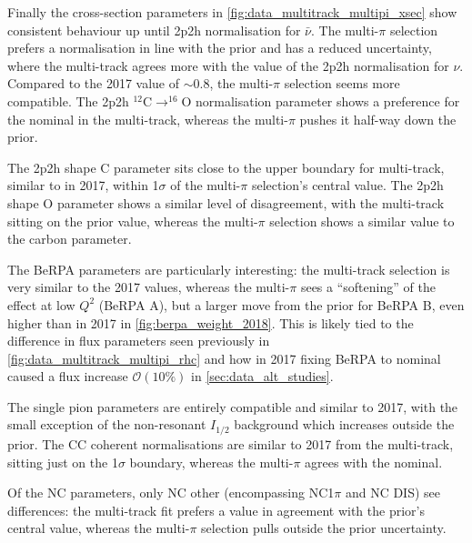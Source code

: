 Finally the cross-section parameters in \autoref{fig:data_multitrack_multipi_xsec} show consistent behaviour up until 2p2h normalisation for $\bar{\nu}$. The multi-$\pi$ selection prefers a normalisation in line with the prior and has a reduced uncertainty, where the multi-track agrees more with the value of the 2p2h normalisation for $\nu$. Compared to the 2017 value of $\sim0.8$, the multi-$\pi$ selection seems more compatible. The 2p2h $^{12}\text{C}\rightarrow^{16}\text{O}$ normalisation parameter shows a preference for the nominal in the multi-track, whereas the multi-$\pi$ pushes it half-way down the prior.

The 2p2h shape C parameter sits close to the upper boundary for multi-track, similar to in 2017, within 1$\sigma$ of the multi-$\pi$ selection's central value. The 2p2h shape O parameter shows a similar level of disagreement, with the multi-track sitting on the prior value, whereas the multi-$\pi$ selection shows a similar value to the carbon parameter. 

The BeRPA parameters are particularly interesting: the multi-track selection is very similar to the 2017 values, whereas the multi-$\pi$ sees a ``softening'' of the effect at low $Q^2$ (BeRPA A), but a larger move from the prior for BeRPA B, even higher than in 2017 in \autoref{fig:berpa_weight_2018}. This is likely tied to the difference in flux parameters seen previously in \autoref{fig:data_multitrack_multipi_rhc} and how in 2017 fixing BeRPA to nominal caused a flux increase $\mathcal{O}(10\%)$ in \autoref{sec:data_alt_studies}.

The single pion parameters are entirely compatible and similar to 2017, with the small exception of the non-resonant $I_{1/2}$ background which increases outside the prior. The CC coherent normalisations are similar to 2017 from the multi-track, sitting just on the 1$\sigma$ boundary, whereas the multi-$\pi$ agrees with the nominal.

Of the NC parameters, only NC other (encompassing NC1$\pi$ and NC DIS) see differences: the multi-track fit prefers a value in agreement with the prior's central value, whereas the multi-$\pi$ selection pulls outside the prior uncertainty.

